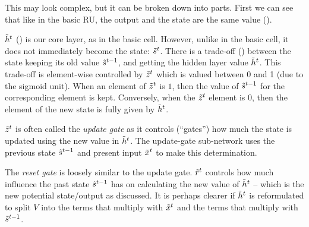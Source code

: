 \documentclass[12pt,parskip]{komatufte}
\begin{document}

This may look complex, but it can be broken down into parts.
First we can see that like in the basic RU, the output and the state are the same value ().

$\nv h_t$  () is our core layer, as in the basic cell.
However, unlike in the basic cell, it does not immediately become the state: $\nv s_t$.
There is a trade-off () between the state keeping its old value $\nv s_{t-1}$, and getting the hidden layer value $\nv h_t$.
This trade-off is element-wise controlled by $\nv z_t$ which is valued between 0 and 1 (due to the sigmoid unit).
When an element of $\nv z_t$ is $1$, then the value of $\nv s_{t-1}$ for the corresponding element is kept.
Conversely, when the $\nv z_t$ element is $0$,  then the element of the new state is fully given by $\nv h_t$.

$\nv z_t$ is often called the \emph{update gate} as it controls (``gates'') how much the state is updated using the new value in $\nv h_t$.
The update-gate sub-network uses the previous state $\nv s_{t-1}$ and present input $\nv x_t$ to make this determination.


The \emph{reset gate} is loosely similar to the update gate.
$\nv r_t$ controls how much influence the past state $\nv s_{t-1}$ has on calculating the new value of $\nv h_t$ -- which is the new potential state/output as discussed.
It is perhaps clearer if $\nv h_t$ is reformulated to split $V$ into the terms that multiply with $\nv x_t$ and the terms that multiply with $\nv s_{t-1}$.
\end{document}
